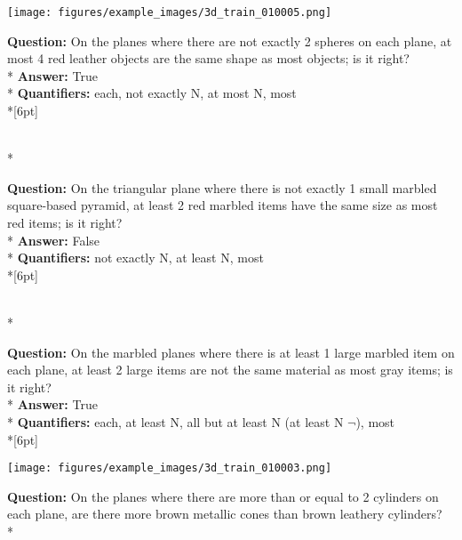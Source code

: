 \begin{figure*}  
\begin{minipage}{0.48\textwidth}
    \texttt{[image: figures/example\_images/3d\_train\_010005.png]}
    \begin{minipage}[t][2.2cm][t]{1\textwidth}
      \footnotesize
      \textbf{Question:} On the planes where there are not exactly 2 spheres on each plane, at most 4 red leather objects are the same shape as most objects; is it right? \\*
      \textbf{Answer:}  True \\*
      \textbf{Quantifiers:}  each, not exactly N, at most N, most\\*[6pt]
    \end{minipage}\\*
    \begin{minipage}[t][2.2cm][t]{1\textwidth}
      \footnotesize
      \textbf{Question:} On the triangular plane where there is not exactly 1 small marbled square-based pyramid, at least 2 red marbled items have the same size as most red items; is it right? \\*
      \textbf{Answer:} False \\*
      \textbf{Quantifiers:}  not exactly N, at least N, most\\*[6pt]
    \end{minipage}\\*
    \begin{minipage}[t][2.2cm][t]{1\textwidth}
      \footnotesize
      \textbf{Question:} On the marbled planes where there is at least 1 large marbled item on each plane, at least 2 large items are not the same material as most gray items; is it right? \\*
      \textbf{Answer:} True \\*
      \textbf{Quantifiers:} each, at least N, all but at least N (at least N $\neg$), most \\*[6pt]
    \end{minipage}
  \end{minipage}
  \hspace{3.5mm}
  \begin{minipage}{0.48\textwidth}
    \texttt{[image: figures/example\_images/3d\_train\_010003.png]}
    \begin{minipage}[t][2.2cm][t]{1\textwidth}
      \footnotesize
      \textbf{Question:}  On the planes where there are more than or equal to 2 cylinders on each plane, are there more brown metallic cones than brown leathery cylinders? \\*

\end{minipage}
\end{minipage}
\end{figure*}

